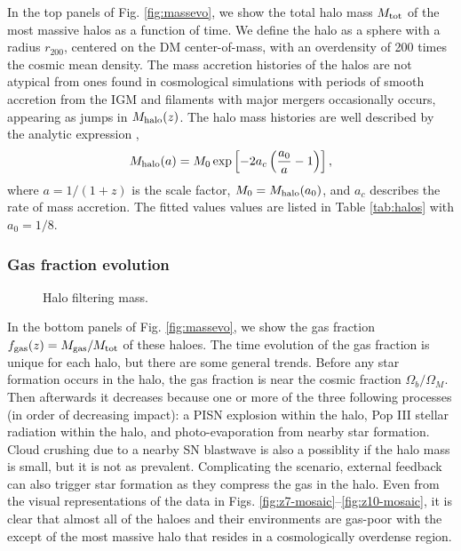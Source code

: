 \documentclass[useAMS,usenatbib]{mn2e}
\begin{document}
In the top panels of Fig. \ref{fig:massevo}, we show the total halo
mass $M_{\rm tot}$ of the most massive halos as a function of time.
We define the halo as a sphere with a radius $r_{200}$, centered on
the DM center-of-mass, with an overdensity of 200 times the cosmic
mean density.  The mass accretion histories of the halos are not
atypical from ones found in cosmological simulations with periods of
smooth accretion from the IGM and filaments with major mergers
occasionally occurs, appearing as jumps in $M_{\rm halo}(z)$.  The
halo mass histories are well described by the analytic expression
\citep{Wechsler02},
%
\begin{equation}
  \label{eqn:mhalo}
  M_{\rm halo}(a) = M_0 \exp \left[-2a_c\left(\frac{a_0}{a} -
    1\right)\right],
\end{equation}
%
where $a = 1/(1+z)$ is the scale factor, $M_0 = M_{\rm halo}(a_0)$,
and $a_c$ describes the rate of mass accretion.  The fitted values
values are listed in Table \ref{tab:halos} with $a_0 = 1/8$.

\subsubsection{Gas fraction evolution}
\label{sec:fgas}

\begin{figure}
  \vspace{200pt}
  \caption{\label{fig:filtering} Halo filtering mass.}
\end{figure}

In the bottom panels of Fig. \ref{fig:massevo}, we show the gas
fraction $f_{\rm gas}(z) = M_{\rm gas} / M_{\rm tot}$ of these haloes.
The time evolution of the gas fraction is unique for each halo, but
there are some general trends.  Before any star formation occurs in
the halo, the gas fraction is near the cosmic fraction $\Omega_b /
\Omega_M$.  Then afterwards it decreases because one or more of the
three following processes (in order of decreasing impact): a PISN
explosion within the halo, Pop III stellar radiation within the halo,
and photo-evaporation from nearby star formation.  Cloud crushing due
to a nearby SN blastwave is also a possiblity if the halo mass is
small, but it is not as prevalent.  Complicating the scenario,
external feedback can also trigger star formation as they compress the
gas in the halo.  Even from the visual representations of the data in
Figs. \ref{fig:z7-mosaic}--\ref{fig:z10-mosaic}, it is clear that
almost all of the haloes and their environments are gas-poor with the
except of the most massive halo that resides in a cosmologically
overdense region.
\end{document}
